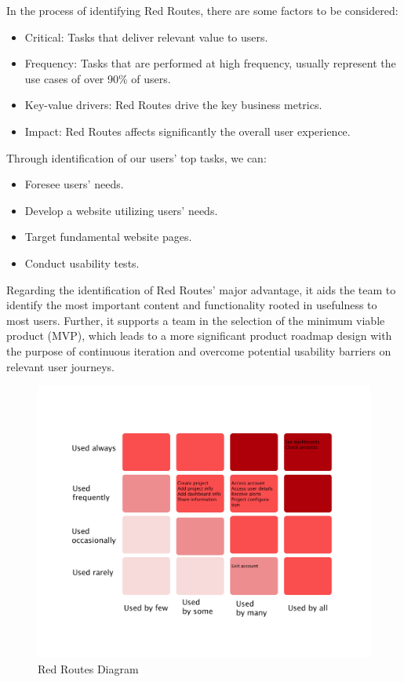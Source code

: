 \documentclass[a4paper,twoside,10pt]{report}
\begin{document}
In the process of identifying Red Routes, there are some factors to be considered:
\begin{itemize}
	\item  Critical: Tasks that deliver relevant value to users.
 	\item Frequency: Tasks that are performed at high frequency, usually represent the use cases of over 90\% of users.
 	\item Key-value drivers: Red Routes drive the key business metrics.
 	\item  Impact: Red Routes affects significantly the overall user experience.
\end{itemize}
Through identification of our users' top tasks, we can:
\begin{itemize}
	\item Foresee users' needs.
	\item Develop a website utilizing users' needs.
	\item Target fundamental website pages.
	\item Conduct usability tests.
\end{itemize}	
Regarding the identification of Red Routes' major advantage, it aids the team to identify the most important content and functionality rooted in usefulness to most users.  Further, it supports a team in the selection of the minimum viable product (MVP), which leads to a more significant product roadmap design with the purpose of continuous iteration and overcome potential usability barriers on relevant user journeys. 
\begin{figure}[h!]
\center
    \includegraphics[width=\textwidth]{red-routes.png}
\caption{Red Routes Diagram}
\end{figure}
\end{document}
